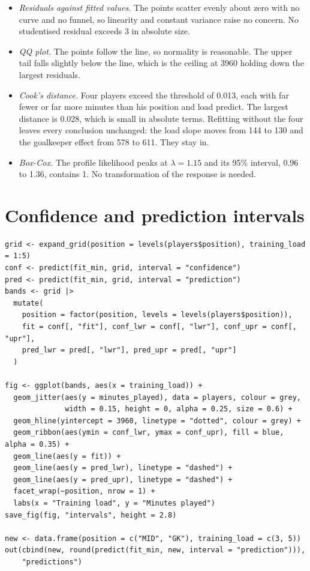 \documentclass[12pt,notitlepage]{report}
\begin{document}
\inputminted{text}{output/check-numbers.txt}
\inputminted{text}{output/influential.txt}
\inputminted{text}{output/sensitivity.txt}

\begin{itemize}
  \item \emph{Residuals against fitted values.} The points scatter evenly
    about zero with no curve and no funnel, so linearity and constant
    variance raise no concern. No studentised residual exceeds 3 in absolute
    size.
  \item \emph{QQ plot.} The points follow the line, so normality is
    reasonable. The upper tail falls slightly below the line, which is the
    ceiling at 3960 holding down the largest residuals.
  \item \emph{Cook's distance.} Four players exceed the threshold of 0.013,
    each with far fewer or far more minutes than his position and load
    predict. The largest distance is 0.028, which is small in absolute terms.
    Refitting without the four leaves every conclusion unchanged: the load
    slope moves from 144 to 130 and the goalkeeper effect from 578 to 611.
    They stay in.
  \item \emph{Box-Cox.} The profile likelihood peaks at $\lambda = 1.15$ and
    its 95\% interval, 0.96 to 1.36, contains 1. No transformation of the
    response is needed.
\end{itemize}

\section{Confidence and prediction intervals}

\begin{verbatim}
grid <- expand_grid(position = levels(players$position), training_load = 1:5)
conf <- predict(fit_min, grid, interval = "confidence")
pred <- predict(fit_min, grid, interval = "prediction")
bands <- grid |>
  mutate(
    position = factor(position, levels = levels(players$position)),
    fit = conf[, "fit"], conf_lwr = conf[, "lwr"], conf_upr = conf[, "upr"],
    pred_lwr = pred[, "lwr"], pred_upr = pred[, "upr"]
  )

fig <- ggplot(bands, aes(x = training_load)) +
  geom_jitter(aes(y = minutes_played), data = players, colour = grey,
              width = 0.15, height = 0, alpha = 0.25, size = 0.6) +
  geom_hline(yintercept = 3960, linetype = "dotted", colour = grey) +
  geom_ribbon(aes(ymin = conf_lwr, ymax = conf_upr), fill = blue, alpha = 0.35) +
  geom_line(aes(y = fit)) +
  geom_line(aes(y = pred_lwr), linetype = "dashed") +
  geom_line(aes(y = pred_upr), linetype = "dashed") +
  facet_wrap(~position, nrow = 1) +
  labs(x = "Training load", y = "Minutes played")
save_fig(fig, "intervals", height = 2.8)

new <- data.frame(position = c("MID", "GK"), training_load = c(3, 5))
out(cbind(new, round(predict(fit_min, new, interval = "prediction"))),
    "predictions")
\end{verbatim}
\end{document}
